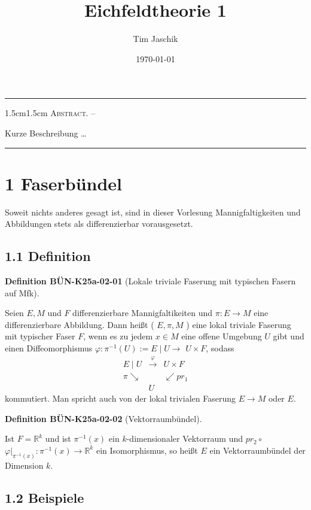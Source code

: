 \documentclass[10pt, letterpaper]{article}
\title{Eichfeldtheorie 1}
\author{Tim Jaschik}
\date{\today}
\renewenvironment{abstract}
  {
    \begin{adjustwidth}{1.5cm}{1.5cm}
    \small
    \textsc{Abstract. –}%
  }
  {
    \end{adjustwidth}
  }
\newcommand{\CustomHeading}[3]{%
  \par\medskip\noindent%
  \textbf{#1 #2} \textnormal{(#3)}.\enskip%
}
\newenvironment{DEF}[2]{\begin{unitbox}\CustomHeading{Definition}{#1}{#2}}{\end{unitbox}}
\begin{document}
\maketitle
\rule{\textwidth}{0.5pt}
\begin{abstract}
Kurze Beschreibung …
\end{abstract}
\rule{\textwidth}{0.5pt}
\vspace{0.5cm}

\tableofcontents

\pagebreak


\section{1 Faserbündel}
Soweit nichts anderes gesagt ist, sind in dieser Vorlesung Mannigfaltigkeiten und Abbildungen stets als differenzierbar vorausgesetzt.

\subsection*{1.1 Definition}

\begin{DEF}{BÜN-K25a-02-01}{Lokale triviale Faserung mit typischen Fasern auf Mfk}
Seien $E, M$ und $F$ differenzierbare Mannigfaltikeiten und $\pi: E \rightarrow M$ eine differenzierbare Abbildung. Dann heißt ( $E, \pi, M$ ) eine lokal triviale Faserung mit typischer Faser $F$, wenn es zu jedem $x \in M$ eine offene Umgebung $U$ gibt und einen Diffeomorphismus $\varphi: \pi^{-1}(U):=E \mid U \rightarrow$ $U \times F$, sodass
$$
\begin{array}{lll}
E \mid U & \xrightarrow{\varphi} & U \times F \\
\pi \searrow & & \swarrow p r_{1} \\
& U &
\end{array}
$$
kommutiert. Man spricht auch von der lokal trivialen Faserung $E \rightarrow M$ oder $E$.
\end{DEF}



\begin{DEF}{BÜN-K25a-02-02}{Vektorraumbündel}
Ist $F=\mathbb{R}^{k}$ und ist $\pi^{-1}(x)$ ein $k$-dimensionaler Vektorraum und $p r_{2} \circ$ $\left.\varphi\right|_{\pi^{-1}(x)}: \pi^{-1}(x) \rightarrow \mathbb{R}^{k}$ ein Isomorphismus, so heißt $E$ ein Vektorraumbündel der Dimension $k$.
\end{DEF}

\subsection*{1.2 Beispiele}
\end{document}
